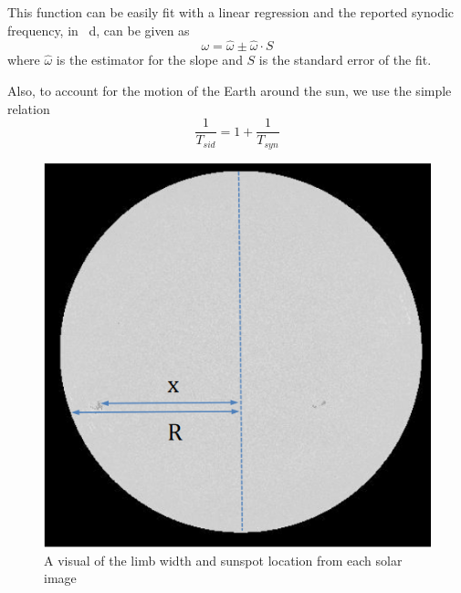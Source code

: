 \documentclass[%
aip,
jmp,
reprint,
floatfix,
]{revtex4-1}
\begin{document}
	This function can be easily fit with a linear regression and the reported synodic frequency, in \si{\per \day}, can be given as 
	\begin{equation}
	\omega = \hat{\omega} \pm \hat{\omega} \cdot S
	\label{eqn:err}
	\end{equation}
	where $\hat{\omega}$ is the estimator for the slope and $S$ is the standard error of the fit.
	
	Also, to account for the motion of the Earth around the sun, we use the simple relation
	\begin{equation}
	\frac{1}{T_{sid}} = 1 + \frac{1}{T_{syn}}
	\end{equation}
	
	\begin{figure}
		\includegraphics[width=.9\linewidth]{figs/pos.png}
		\caption{A visual of the limb width and sunspot location from each solar image}
		\label{fig:pos}
	\end{figure}

\end{document}
